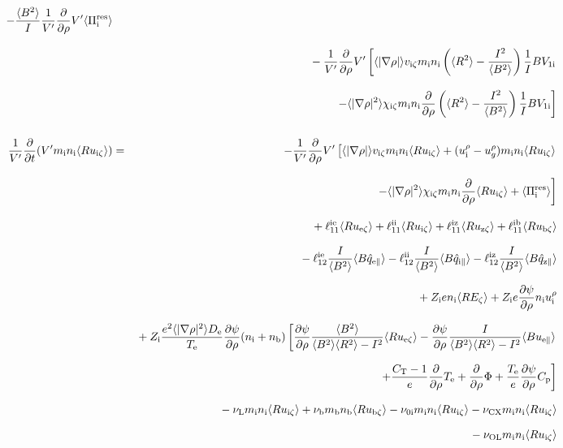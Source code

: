 \documentclass[11pt]{article}
\def\r#1{{\rm#1}}
\def\aves#1{\langle#1\rangle}
\def\dd#1#2{\frac{\partial #1}{\partial #2}}
\def\para{\parallel}
\def\ddrho{\frac{\partial}{\partial\rho}}
\def\ddt{\frac{\partial}{\partial t}}
\def\mi{m_\r{i}}
\def\mb{m_\r{b}}
\def\ni{n_\r{i}}
\def\nb{n_\r{b}}
\def\Te{T_\r{e}}
\def\Zi{Z_\r{i}}
\def\uzt#1{u_{\r{#1}\zeta}}
\def\upara#1{u_{\r{#1}\para}}
\def\qhatpara#1{\hat{q}_{\r{#1}\para}}
\def\urho#1{u_\r{#1}^\rho}
\def\ugrho{u_{g}^\rho}
\def\chis#1{\chi_\r{#1}}
\def\De{D_\r{e}}
\def\nun#1{\nu_\r{0#1}}
\def\bri{\aves{B^2}\aves{R^2} - I^2}
\def\nuL{\nu_\r{L}}
\def\nuCX{\nu_\r{CX}}
\def\nub{\nu_\r{b}}
\def\nuOL{\nu_\r{OL}}
\begin{document}
\begin{eqnarray}
%
  - \frac{\aves{B^2}}{I} \frac{1}{V'} \ddrho V' \aves{\Pi_\r{i}^\r{res}}
\nonumber\\[3mm]&&{}
%
  - \frac{1}{V'} \ddrho V' 
    \left[  \aves{|\nabla\rho|} v_{\r{i}\zeta} \mi \ni
          \left(\aves{R^2} - \frac{I^2}{\aves{B^2}}\right) \frac{1}{I}BV_{1\r{i}} \right.
\nonumber\\[3mm]&&{}
    \left.- \aves{|\nabla\rho|^2} \chis{i\zeta} \mi \ni
          \ddrho \left(\aves{R^2} - \frac{I^2}{\aves{B^2}}\right) \frac{1}{I}BV_{1\r{i}}\right]
\\[5mm]
 \frac{1}{V'} \ddt (V' \mi \ni \aves{R \uzt{i}}) &=&
%
  - \frac{1}{V'} \ddrho V' \left[  \aves{|\nabla\rho|} v_{\r{i}\zeta} \mi \ni \aves{R \uzt{i}}
			       +   (\urho{i} - \ugrho) \mi \ni \aves{R \uzt{i}} \right.
\nonumber\\[3mm]&&{}
                        \left. - \aves{|\nabla\rho|^2} \chis{i\zeta} \mi \ni
			         \ddrho \aves{R \uzt{i}}
                               + \aves{\Pi_\r{i}^\r{res}} \right]
\nonumber\\[3mm]&&{}
%
  + \ell_{11}^\r{ie} \aves{R \uzt{e}}
  + \ell_{11}^\r{ii} \aves{R \uzt{i}}
  + \ell_{11}^\r{iz} \aves{R \uzt{z}}
  + \ell_{11}^\r{ib} \aves{R \uzt{b}}
\nonumber\\[2.5mm]&&{}
%
  - \ell_{12}^\r{ie} \frac{I}{\aves{B^2}} \aves{B \qhatpara{e}}
  - \ell_{12}^\r{ii} \frac{I}{\aves{B^2}} \aves{B \qhatpara{i}}
  - \ell_{12}^\r{iz} \frac{I}{\aves{B^2}} \aves{B \qhatpara{z}}
\nonumber\\[2.5mm]&&{}
%
  + \Zi e                 \ni \aves{R E_\zeta}
%
  + \Zi e \dd{\psi}{\rho} \ni \urho{i}
%
\nonumber\\[2.5mm]&&{}
%
%
  + \Zi \frac{e^2 \aves{|\nabla\rho|^2} \De}{\Te} \dd{\psi}{\rho} (\ni+\nb)
    \left[  \dd{\psi}{\rho} \frac{\aves{B^2}}{\bri} \aves{R \uzt{e}}
          - \dd{\psi}{\rho} \frac{I}{\bri} \aves{B \upara{e}} \right.
\nonumber\\[2.5mm]&&{}
    \left.+ \frac{C_\r{T}-1}{e} \ddrho \Te
	  + \ddrho \Phi
	  + \frac{\Te}{e} \dd{\psi}{\rho} C_\r{p} \right]
\nonumber\\[2.5mm]&&{}
%
  - \nuL  \mi \ni \aves{R \uzt{i}}
%
  + \nub  \mb \nb \aves{R \uzt{b}}
%
  - \nun{i} \mi \ni \aves{R \uzt{i}}
%
  - \nuCX \mi \ni \aves{R \uzt{i}}
\nonumber\\[2.5mm]&&{}
%
  - \nuOL \mi \ni \aves{R \uzt{i}}
\\[5mm]

\end{eqnarray}
\end{document}
